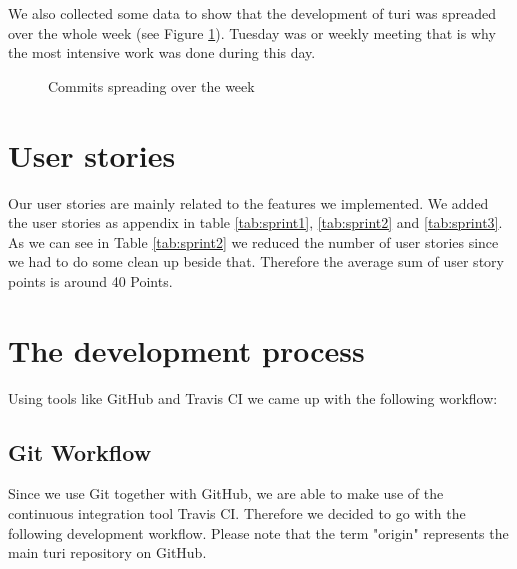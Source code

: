 \documentclass[a4paper]{article}
\begin{document}
We also collected some data to show that the development of turi was spreaded over the whole week (see Figure \ref{fig:commitfrequency}). Tuesday was or weekly meeting that is why the most intensive work was done during this day. \\

\begin{figure}[!htb]
  \begin{center}
    \caption{Commits spreading over the week}
    \label{fig:commitfrequency}
  \end{center}
\end{figure}

\section{User stories}
Our user stories are mainly related to the features we implemented. We added the user stories as appendix in table \ref{tab:sprint1}, \ref{tab:sprint2} and \ref{tab:sprint3}. As we can see in Table \ref{tab:sprint2} we reduced the number of user stories since we had to do some clean up beside that. Therefore the average sum of user story points is around 40 Points.

\section{The development process}

Using tools like GitHub and Travis CI we came up with the following workflow:

\subsection{Git Workflow}
Since we use Git together with GitHub, we are able to make use of the continuous integration tool Travis CI. Therefore we decided to go with the following development workflow. Please note that the term "origin" represents the main turi repository on GitHub.
\end{document}
